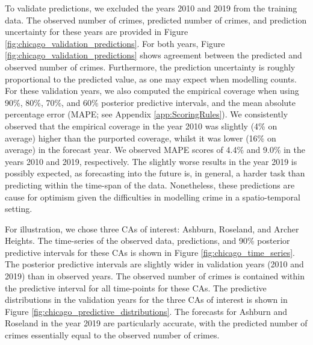 \documentclass[nojss]{jss}
\begin{document}
To validate predictions, we excluded the years 2010 and 2019 from the training data. 
The observed number of crimes, predicted number of crimes, and prediction uncertainty for these years are provided in Figure \ref{fig:chicago_validation_predictions}. 
For both years, Figure \ref{fig:chicago_validation_predictions} shows agreement between the predicted and observed number of crimes. Furthermore, 
 the prediction uncertainty is roughly proportional to the predicted value, as one may expect when modelling counts.
For these validation years, we also computed the empirical coverage when using 90\%, 80\%, 70\%, and 60\% posterior predictive intervals, and the mean absolute percentage error (MAPE; see Appendix \ref{app:ScoringRules}). 
We consistently observed that the empirical coverage in the year 2010 was slightly (4\% on average) higher than the purported coverage, whilst it was lower (16\% on average) in the forecast year.
We observed MAPE scores of 4.4\% and 9.0\% in the years 2010 and 2019, respectively.
The slightly worse results in the year 2019 is possibly expected, as forecasting into the future is, in general, a harder task than predicting within the time-span of the data.
Nonetheless, these predictions are cause for optimism given the difficulties in modelling crime in a spatio-temporal setting. 


For illustration, we chose three CAs of interest: 
Ashburn, %
Roseland, %
and Archer Heights. %
The time-series of the observed data, predictions, and 90\% posterior predictive intervals for these CAs is shown in Figure \ref{fig:chicago_time_series}. 
The posterior predictive intervals are slightly wider in validation years (2010 and 2019) than in observed years. 
 The observed number of crimes is contained within the predictive interval for all time-points for these CAs.
The predictive distributions in the validation years for the three CAs of interest is shown in Figure \ref{fig:chicago_predictive_distributions}.
The forecasts for Ashburn and Roseland in the year 2019 are particularly accurate, with the predicted number of crimes essentially equal to the observed number of crimes. 
\end{document}
